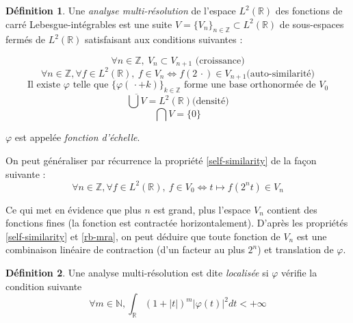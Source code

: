 \documentclass[]{article}
\theoremstyle{remark}
\theoremstyle{definition}
\newtheorem{mydef}{Définition}
\begin{document}
	\begin{mydef}
		Une \textit{analyse multi-résolution} de l'espace $L^2(\mathbb{R})$ des fonctions de carré Lebesgue-intégrables est une suite $V = \{V_n\}_{n \in \mathbb{Z}} \subset L^2(\mathbb{R})$ de sous-espaces fermés de $L^2(\mathbb{R})$ satisfaisant aux conditions suivantes :

		\begin{equation}
			\label{growth}
			\forall n \in \mathbb{Z}, ~ V_{n} \subset V_{n+1} \text{ (croissance)}
		\end{equation}
		\begin{equation}
			\label{self-similarity}
			\forall n \in \mathbb{Z}, \forall f \in L^2(\mathbb{R}), ~ f \in V_n \Longleftrightarrow f (2 \, \cdot ) \in V_{n+1} \text{(auto-similarité)}
		\end{equation}
		\begin{equation}
			\label{rb-mra}
			\text{Il existe $\varphi$ telle que $\{\varphi(\, \cdot + k)\}_{k \in \mathbb{Z}}$ forme une base orthonormée de $V_0$}
		\end{equation}
		\begin{equation}
			\label{density}
			\overline{\bigcup V} = L^2(\mathbb{R}) \text{(densité)}
		\end{equation}
		\begin{equation}
			\label{inter}
			\bigcap V = \{0\}
		\end{equation}
		
		$\varphi$ est appelée \textit{fonction d'échelle}.
	\end{mydef}
	
	On peut généraliser par récurrence la propriété \ref{self-similarity} de la façon suivante :
	\begin{equation}
		\forall n \in \mathbb{Z}, \forall f \in L^2(\mathbb{R}), ~ f \in V_0 \Longleftrightarrow t \mapsto f \left(2^n t\right) \in V_{n}
	\end{equation}

	Ce qui met en évidence que plus $n$ est grand, plus l'espace $V_n$ contient des fonctions fines (la fonction est contractée horizontalement). D'après les propriétés \ref{self-similarity} et \ref{rb-mra}, on peut déduire que toute fonction de $V_n$ est une combinaison linéaire de contraction (d'un facteur au plus $2^n$) et translation de $\varphi$.

	\begin{mydef}
		Une analyse multi-résolution est dite \textit{localisée} si $\varphi$ vérifie la condition suivante
		\begin{equation}
			\label{localized}
			\forall m \in \mathbb{N}, \int_\mathbb{R} (1+|t|)^m |\varphi(t)|^2 dt < + \infty
		\end{equation}
	\end{mydef}
	
\end{document}
